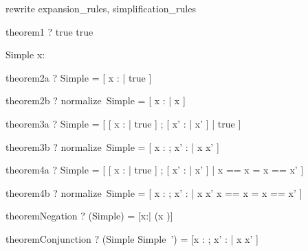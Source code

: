 \begin{zsection}
\SECTION rewrite \parents expansion\_rules, simplification\_rules
\end{zsection}

\begin{theorem}{theorem1}
  \vdash? true \iff true
\end{theorem}




\begin{schema}{Simple}
  x: \nat
\end{schema}

\begin{theorem}{theorem2a}
  \vdash? Simple = [ x : \nat | true ]
\end{theorem}

\begin{theorem}{theorem2b}
  \vdash? normalize~Simple = [ x : \arithmos | x \in \nat ]
\end{theorem}

\begin{theorem}{theorem3a}
  \vdash? \Delta Simple = [ [ x : \nat | true ] ; [ x' : \arithmos | x' \in \nat ] | true ]
\end{theorem}

\begin{theorem}{theorem3b}
  \vdash? normalize~\Delta Simple = [ x : \arithmos ; x' : \arithmos | x \in \nat \land x' \in \nat  ]
\end{theorem}

\begin{theorem}{theorem4a}
  \vdash? \Xi Simple =
	    [ [ x : \nat | true ] ; [ x' : \arithmos | x' \in \nat ] | \lblot x == x \rblot = \lblot x == x' \rblot ] 
\end{theorem}

\begin{theorem}{theorem4b}
  \vdash? normalize~\Xi Simple =
	    [ x : \arithmos ; x' : \arithmos | x \in \nat \land x' \in \nat  \land
			                                                 \lblot x == x \rblot = \lblot x == x' \rblot  ]
\end{theorem}

\begin{theorem}{theoremNegation}
  \vdash? (\lnot Simple) = [x:\arithmos | \lnot (x \in \nat)]
\end{theorem}

\begin{theorem}{theoremConjunction}
  \vdash? (Simple \land Simple~') = [x : \arithmos; x' : \arithmos | x \in \nat \land x' \in \nat]
\end{theorem}

